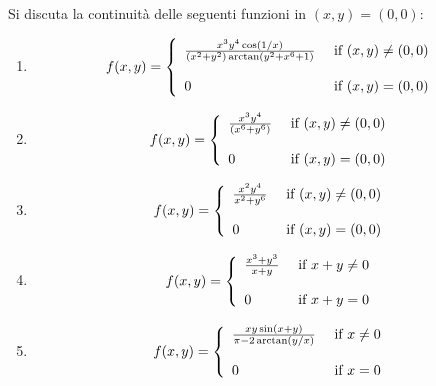  Si discuta la continuit\`a delle seguenti 
funzioni in $(x,y)=(0,0)$:
\begin{enumerate}
\item 
$$f(x,y)=\left\{ \begin{array}{ll}
{x^3y^4\cos(1/x)\over (x^2+y^2)\arctan(y^2+x^6+1)} &\ \mbox{if}\ (x,y)\neq(0,0)\\
\\
0 & \ \mbox{if}\ (x,y)=(0,0)\\
\end{array}\right.$$
\item
$$f(x,y)=\left\{ \begin{array}{ll}
{x^3y^4\over (x^{6}+y^{6})} &\ \mbox{if}\ (x,y)\neq(0,0)\\
\\
0 & \ \mbox{if}\ (x,y)=(0,0)\\
\end{array}\right.$$
\item$$f(x,y)=\left\{ \begin{array}{ll}
{x^2y^4\over x^2+y^6} &\ \mbox{if}\ (x,y)\neq(0,0)\\
\\
0 & \ \mbox{if}\ (x,y)=(0,0)\\
\end{array}\right.$$
\item$$f(x,y)=\left\{ \begin{array}{ll}
{x^3+y^3\over x+y} &\ \mbox{if}\ x+y\neq0\\
\\
0 & \ \mbox{if}\ x+y=0\\
\end{array}\right.$$
\item 
$$f(x,y)=\left\{ \begin{array}{ll}
{xy\sin(x+y)\over \pi-2\arctan(y/x)} &\ \mbox{if}\ x\neq0\\
\\
0 & \ \mbox{if}\ x=0\\
\end{array}\right.$$
\end{enumerate}

